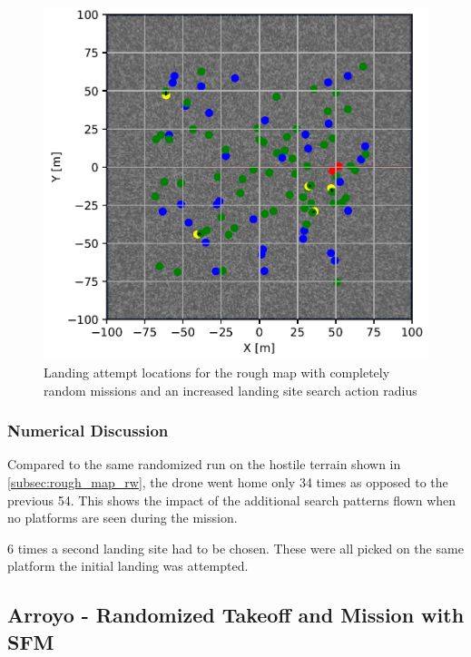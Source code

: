     \begin{figure}[h]
    \centering
    \includegraphics[scale=0.5]{images/evaluation/landing_rough_rand_lr.png}
    \caption{Landing attempt locations for the rough map with completely random missions and an increased landing site search action radius}
    \label{fig:land_rough_rand_radius}
    \end{figure}

    \subsubsection{Numerical Discussion}

    Compared to the same randomized run on the hostile terrain shown in \cref{subsec:rough_map_rw}, the drone went home only 34 times as opposed to the previous 54. This shows the impact of the additional search patterns flown when no platforms are seen during the mission. 

    6 times a second landing site had to be chosen. These were all picked on the same platform the initial landing was attempted. 
    
\clearpage%

\subsection{Arroyo - Randomized Takeoff and Mission with SFM}\label{subsec:SFM_complete_rand}

